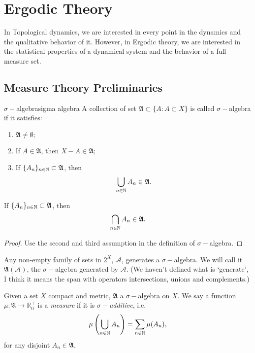 \documentclass[12pt,a4paper]{article}
\begin{document}
		
		
	
	
	
	
	
	
	
	
	
	
	
	
	

	\section{Ergodic Theory}
	In Topological dynamics, we are interested in every point in the dynamics and the qualitative behavior of it. However, in Ergodic theory, we are interested in the statistical properties of a dynamical system and the behavior of a full-measure set.
	
	\subsection{Measure Theory Preliminaries}
	\newcommand{\frakA}{\mathfrak{A}}
	\begin{definition}{$\sigma-$algebra}{sigma algebra}
		A collection of set $\frakA\subset \{A:A\subset X\}$ is called $\sigma-$algebra if it satisfies:
		\begin{enumerate}
			\item $\frakA\neq \emptyset$;
			\item If $A\in \frakA$, then $X-A\in \frakA$;
			\item If $\{A_n\}_{n\in\N}\subset \frakA$, then 
			$$
			\bigcup_{n\in \N} A_n \in \frakA.
			$$
		\end{enumerate}
	\end{definition}
	
	\begin{proposition}{}{}
		If $\{A_n\}_{n\in\N}\subset \frakA$, then 
		$$
		\bigcap_{n\in \N} A_n \in \frakA.
		$$
		
 	\end{proposition}
	\begin{proof}
		Use the second and third assumption in the definition of $\sigma-$algebra.
	\end{proof}
			\newcommand{\A}{\mathcal{A}}
	Any non-empty family of sets in $2^X$, $\A$, generates a $\sigma-$algebra. We will call it $\frakA(\A)$, the $\sigma-$algebra generated by $\A$. (We haven't defined what is 	`generate', I think it means the span with operators intersections, unions and complements.)
	\begin{definition}{}{}
		Given a set $X$ compact and metric, $\frakA$ a $\sigma-$algebra on $X$. We say a function $\mu: \frakA\rightarrow \mathbb{R}_0^+$ is a \emph{measure} if it is \emph{$\sigma-$additive}, i.e.
		$$
		\mu\left(\bigcup_{n\in \mathbb{N}} A_n\right) = \sum_{n\in\mathbb{N}} \mu(A_n),
		$$
		for any disjoint $A_n\in \frakA$.
	\end{definition}
	
\end{document}
